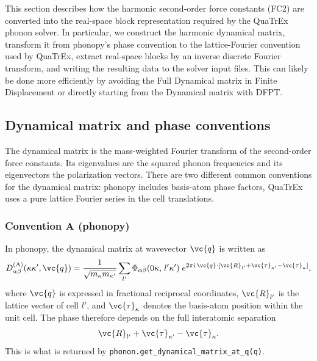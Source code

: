 This section describes how the harmonic second-order force constants
(FC2) are converted into the real-space block representation required
by the QuaTrEx phonon solver.  In particular, we construct the
harmonic dynamical matrix, transform it from phonopy's phase
convention to the lattice-Fourier convention used by QuaTrEx,
extract real-space blocks by an inverse discrete Fourier transform,
and writing the resulting data to the solver input files. This can likely be
done more efficiently by avoiding the Full Dynamical matrix in Finite Displacement
or directly starting from the Dynamical matrix with DFPT.

\subsection{Dynamical matrix and phase conventions}
\label{sec:dynmat}

The dynamical matrix is the mass-weighted Fourier transform of
the second-order force constants.  Its eigenvalues are the squared
phonon frequencies and its eigenvectors the polarization vectors. There are
two different common conventions for the dynamical matrix:
phonopy includes basis-atom phase factors, QuaTrEx uses a pure lattice Fourier
series in the cell translations.

\subsubsection{Convention A (phonopy)}

In phonopy, the dynamical matrix at wavevector $\vc{q}$ is written as
\begin{equation}\label{eq:DA}
  D_{\alpha\beta}^{(\mathrm{A})}(\kappa\kappa',\vc{q})
  = \frac{1}{\sqrt{m_\kappa m_{\kappa'}}}
    \sum_{l'}
    \Phi_{\alpha\beta}(0\kappa,\,l'\kappa')\;
    e^{2\pi i\,\vc{q}\cdot
      [\vc{R}_{l'} + \vc{\tau}_{\kappa'} - \vc{\tau}_\kappa]},
\end{equation}
where $\vc{q}$ is expressed in fractional reciprocal coordinates,
$\vc{R}_{l'}$ is the lattice vector of cell $l'$, and
$\vc{\tau}_\kappa$ denotes the basis-atom position within the unit
cell.  The phase therefore depends on the full interatomic separation
\begin{equation}
  \vc{R}_{l'} + \vc{\tau}_{\kappa'} - \vc{\tau}_\kappa.
\end{equation}
This is what is returned by \texttt{phonon.get\_dynamical\_matrix\_at\_q(q)}.

